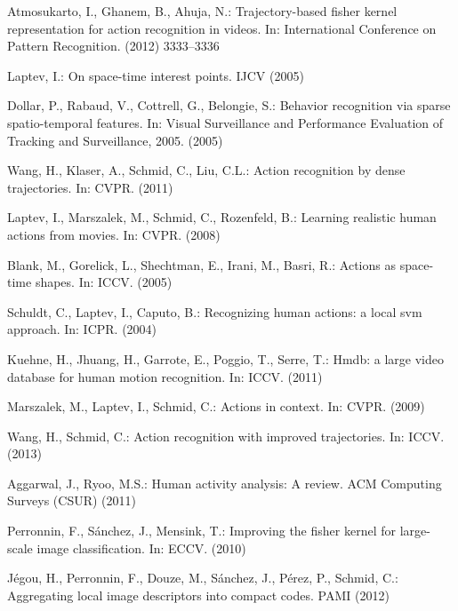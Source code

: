 \documentclass[runningheads]{llncs}
\begin{document}
\begin{thebibliography}{10}
Atmosukarto, I., Ghanem, B., Ahuja, N.:
\newblock Trajectory-based fisher kernel representation for action recognition
  in videos.
\newblock In: International Conference on Pattern Recognition. (2012)
  3333--3336

Laptev, I.:
\newblock On space-time interest points.
\newblock IJCV (2005)

Dollar, P., Rabaud, V., Cottrell, G., Belongie, S.:
\newblock Behavior recognition via sparse spatio-temporal features.
\newblock In: Visual Surveillance and Performance Evaluation of Tracking and
  Surveillance, 2005. (2005)

Wang, H., Klaser, A., Schmid, C., Liu, C.L.:
\newblock Action recognition by dense trajectories.
\newblock In: CVPR. (2011)

Laptev, I., Marszalek, M., Schmid, C., Rozenfeld, B.:
\newblock Learning realistic human actions from movies.
\newblock In: CVPR. (2008)

Blank, M., Gorelick, L., Shechtman, E., Irani, M., Basri, R.:
\newblock Actions as space-time shapes.
\newblock In: ICCV. (2005)

Schuldt, C., Laptev, I., Caputo, B.:
\newblock Recognizing human actions: a local svm approach.
\newblock In: ICPR. (2004)

Kuehne, H., Jhuang, H., Garrote, E., Poggio, T., Serre, T.:
\newblock Hmdb: a large video database for human motion recognition.
\newblock In: ICCV. (2011)

Marszalek, M., Laptev, I., Schmid, C.:
\newblock Actions in context.
\newblock In: CVPR. (2009)

Wang, H., Schmid, C.:
\newblock Action recognition with improved trajectories.
\newblock In: ICCV. (2013)

Aggarwal, J., Ryoo, M.S.:
\newblock Human activity analysis: A review.
\newblock ACM Computing Surveys (CSUR) (2011)

Perronnin, F., S{\'a}nchez, J., Mensink, T.:
\newblock Improving the fisher kernel for large-scale image classification.
\newblock In: ECCV.
\newblock (2010)

J{\'e}gou, H., Perronnin, F., Douze, M., S{\'a}nchez, J., P{\'e}rez, P.,
  Schmid, C.:
\newblock Aggregating local image descriptors into compact codes.
\newblock PAMI (2012)


\end{thebibliography}
\end{document}
